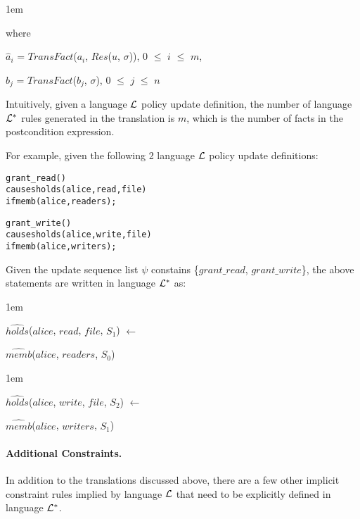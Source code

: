 \documentclass[global,twocolumn,final]{svjour}
\newenvironment{vquote}
  {\begin{list}{}{\leftmargin 1em}\item[]}
  {\end{list}}
\newenvironment{vverbatim}
  {\begin{alltt}}
  {\vspace{-\baselineskip}\end{alltt}}
\begin{document}
          \begin{vquote}
            where

            $\hat{a}_{i}$ = $TransFact$($a_{i}$, $Res$($u$, $\sigma$)),
            $0$ $\leq$ $i$ $\leq$ $m$,

            $\hat{b}_{j}$ = $TransFact$($b_{j}$, $\sigma$),
            $0$ $\leq$ $j$ $\leq$ $n$
          \end{vquote}

          Intuitively, given a language ${\cal L}$ policy update definition,
          the number of language ${\cal L}^{*}$ rules generated in the
          translation is $m$, which is the number of facts in the
          postcondition expression.

          For example, given the following 2 language ${\cal L}$ policy update
          definitions:

          \begin{vverbatim}
  grant\_read()
    causes holds(alice, read, file)
    if memb(alice, readers);

  grant\_write()
    causes holds(alice, write, file)
    if memb(alice, writers);
          \end{vverbatim}

          Given the update sequence list $\psi$ constains
          \{$grant\_read$, $grant\_write$\}, the above statements are written
          in language ${\cal L}^{*}$ as:

          \begin{vquote}
            $\hat{holds}$($alice$, $read$, $file$, $S_{1}$) $\leftarrow$

            \hspace{1em}
            $\hat{memb}$($alice$, $readers$, $S_{0}$)
          \end{vquote}

          \begin{vquote}
            $\hat{holds}$($alice$, $write$, $file$, $S_{2}$) $\leftarrow$

            \hspace{1em}
            $\hat{memb}$($alice$, $writers$, $S_{1}$)
          \end{vquote}

        \paragraph{Additional Constraints.}

          In addition to the translations discussed above, there are a few
          other implicit constraint rules implied by language ${\cal L}$
          that need to be explicitly defined in language ${\cal L}^{*}$.
\end{document}
